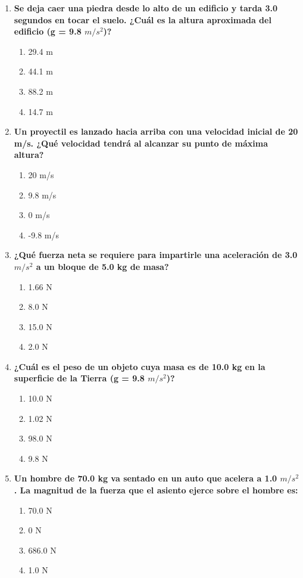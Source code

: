 \documentclass[12pt]{article}
\begin{document}
\begin{enumerate}[label=\arabic*.]
    \item \textbf{Se deja caer una piedra desde lo alto de un edificio y tarda 3.0 segundos en tocar el suelo. ¿Cuál es la altura aproximada del edificio (g = 9.8 $m/s^2$)?}
    \begin{enumerate}[label=\alph*)]
        \item 29.4 m
        \item 44.1 m
        \item 88.2 m
        \item 14.7 m
    \end{enumerate}

    \item \textbf{Un proyectil es lanzado hacia arriba con una velocidad inicial de 20 m/s. ¿Qué velocidad tendrá al alcanzar su punto de máxima altura?}
    \begin{enumerate}[label=\alph*)]
        \item 20 m/s
        \item 9.8 m/s
        \item 0 m/s
        \item -9.8 m/s
    \end{enumerate}

    \item \textbf{¿Qué fuerza neta se requiere para impartirle una aceleración de 3.0 $m/s^2$ a un bloque de 5.0 kg de masa?}
    \begin{enumerate}[label=\alph*)]
        \item 1.66 N
        \item 8.0 N
        \item 15.0 N
        \item 2.0 N
    \end{enumerate}

    \item \textbf{¿Cuál es el peso de un objeto cuya masa es de 10.0 kg en la superficie de la Tierra (g = 9.8 $m/s^2$)?}
    \begin{enumerate}[label=\alph*)]
        \item 10.0 N
        \item 1.02 N
        \item 98.0 N
        \item 9.8 N
    \end{enumerate}

    \item \textbf{Un hombre de 70.0 kg va sentado en un auto que acelera a 1.0 $m/s^2$. La magnitud de la fuerza que el asiento ejerce sobre el hombre es:}
    \begin{enumerate}[label=\alph*)]
        \item 70.0 N
        \item 0 N
        \item 686.0 N
        \item 1.0 N
    \end{enumerate}
\end{enumerate}
\end{document}
